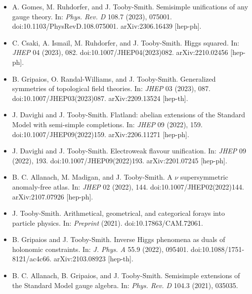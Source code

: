 \documentclass[14pt,letter]{article}
\newcommand{\mybullet}{\textcolor{mycolor}{$\ast$}\ }
\newcounter{customtitle}
\begin{document}
\vspace{0.3cm}
\begin{itemize}[label=\mybullet]

\item A. Gomes, M. Ruhdorfer, and J. Tooby-Smith. {\color{mycolor} Semisimple unifications of any gauge theory}. In: \emph{Phys. Rev. D} 108.7 (2023), 075001. doi:10.1103/PhysRevD.108.075001. arXiv:2306.16439 [hep-ph].

\item \sloppy C. Csaki, A. Ismail, M. Ruhdorfer, and J. Tooby-Smith. {\color{mycolor} Higgs squared}. In: \emph{JHEP} 04 (2023), 082. doi:10.1007/JHEP04(2023)082. arXiv:2210.02456 [hep-ph].

\item B. Gripaios, O. Randal-Williams, and J. Tooby-Smith. {\color{mycolor} Generalized symmetries of topological field theories}. In: \emph{JHEP} 03 (2023), 087. doi:10.1007/JHEP03(2023)087. arXiv:2209.13524 [hep-th].

\item J. Davighi and J. Tooby-Smith. {\color{mycolor} Flatland: abelian extensions of the Standard Model with semi-simple completions}. In: \emph{JHEP} 09 (2022), 159. doi:10.1007/JHEP09(2022)159. arXiv:2206.11271 [hep-ph].

\item J. Davighi and J. Tooby-Smith. {\color{mycolor} Electroweak flavour unification}. In: \emph{JHEP} 09 (2022), 193. doi:10.1007/JHEP09(2022)193. arXiv:2201.07245 [hep-ph].

\item B. C. Allanach, M. Madigan, and J. Tooby-Smith. {\color{mycolor} A \ensuremath{\nu} supersymmetric anomaly-free atlas}. In: \emph{JHEP} 02 (2022), 144. doi:10.1007/JHEP02(2022)144. arXiv:2107.07926 [hep-ph].

\item J. Tooby-Smith. {\color{mycolor} Arithmetical, geometrical, and categorical forays into particle physics}. In: \emph{Preprint} (2021). doi:10.17863/CAM.72061.

\item B. Gripaios and J. Tooby-Smith. {\color{mycolor} Inverse Higgs phenomena as duals of holonomic constraints}. In: \emph{J. Phys. A} 55.9 (2022), 095401. doi:10.1088/1751-8121/ac4c66. arXiv:2103.08923 [hep-th].

\item  B. C. Allanach, B. Gripaios, and J. Tooby-Smith. {\color{mycolor} Semisimple extensions of the Standard Model gauge algebra}. In: \emph{Phys. Rev. D} 104.3 (2021), 035035. 


\end{itemize}
\end{document}
